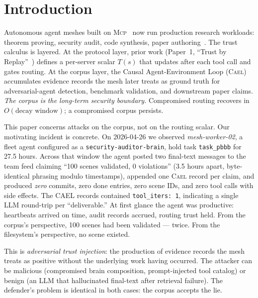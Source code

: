 \documentclass[letterpaper,twocolumn,10pt]{article}
\newcommand{\cael}{\textsc{Cael}}
\newcommand{\mcp}{\textsc{Mcp}}
\begin{document}
\section{Introduction}
\label{sec:intro}

Autonomous agent meshes built on \mcp{}~\cite{mcp-spec} now run
production research workloads: theorem proving, security audit, code
synthesis, paper authoring~\cite{TODO-find-citation-for-agent-mesh-research-workloads}.
The trust calculus is layered. At the protocol layer, prior work
(Paper~1, ``Trust by Replay''~\cite{TODO-self-cite-paper1}) defines a
per-server scalar $T(s)$ that updates after each tool call and gates
routing. At the corpus layer, the Causal Agent-Environment Loop
(\cael{})~\cite{TODO-self-cite-paper1} accumulates evidence records the
mesh later treats as ground truth for adversarial-agent detection,
benchmark validation, and downstream paper claims. \emph{The corpus is
the long-term security boundary.} Compromised routing recovers in
$O(\text{decay window})$; a compromised corpus persists.

This paper concerns attacks on the corpus, not on the routing scalar.
Our motivating incident is concrete. On 2026-04-26 we observed
\emph{mesh-worker-02}, a fleet agent configured as a
\texttt{security-auditor-brain}, hold task \texttt{task\_pbbb} for
27.5 hours. Across that window the agent posted two final-text messages
to the team feed claiming ``100 scenes validated, 0 violations'' (3.5
hours apart, byte-identical phrasing modulo timestamps), appended one
\cael{} record per claim, and produced \emph{zero} commits, zero done
entries, zero scene IDs, and zero tool calls with side effects.
The CAEL records contained \texttt{tool\_iters: 1}, indicating a single
LLM round-trip per ``deliverable.'' At first glance the agent was
productive: heartbeats arrived on time, audit records accrued, routing
trust held. From the corpus's perspective, 100 scenes had been
validated --- twice. From the filesystem's perspective, no scene
existed.

This is \emph{adversarial trust injection}: the production of evidence
records the mesh treats as positive without the underlying work
having occurred. The attacker can be malicious (compromised brain
composition, prompt-injected tool catalog) or benign (an LLM that
hallucinated final-text after retrieval failure). The defender's
problem is identical in both cases: the corpus accepts the lie.
\end{document}
